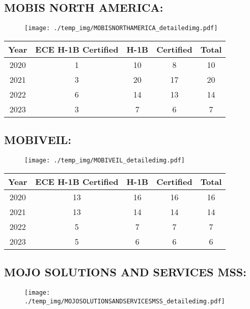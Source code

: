 \documentclass{article}%
\begin{document}
%
\newpage%
\subsection{MOBIS NORTH AMERICA:}%
\label{subsec:MOBISNORTHAMERICA}%
\label{MOBISNORTHAMERICAdetailed}%


\begin{figure}[htbp]%
\centering%
\texttt{[image: ./temp\_img/MOBISNORTHAMERICA\_detailedimg.pdf]}%
\end{figure}

%
\begin{longtable}{c|c|c|c|c}%
\hline%
Year&ECE H{-}1B Certified&H{-}1B&Certified&Total\\%
\hline%
2020&1&10&8&10\\%
\hline%
2021&3&20&17&20\\%
\hline%
2022&6&14&13&14\\%
\hline%
2023&3&7&6&7\\%
\hline%
\end{longtable}

%
\newpage%
\subsection{MOBIVEIL:}%
\label{subsec:MOBIVEIL}%
\label{MOBIVEILdetailed}%


\begin{figure}[htbp]%
\centering%
\texttt{[image: ./temp\_img/MOBIVEIL\_detailedimg.pdf]}%
\end{figure}

%
\begin{longtable}{c|c|c|c|c}%
\hline%
Year&ECE H{-}1B Certified&H{-}1B&Certified&Total\\%
\hline%
2020&13&16&16&16\\%
\hline%
2021&13&14&14&14\\%
\hline%
2022&5&7&7&7\\%
\hline%
2023&5&6&6&6\\%
\hline%
\end{longtable}

%
\newpage%
\subsection{MOJO SOLUTIONS AND SERVICES MSS:}%
\label{subsec:MOJOSOLUTIONSANDSERVICESMSS}%
\label{MOJOSOLUTIONSANDSERVICESMSSdetailed}%


\begin{figure}[htbp]%
\centering%
\texttt{[image: ./temp\_img/MOJOSOLUTIONSANDSERVICESMSS\_detailedimg.pdf]}%
\end{figure}
\end{document}
